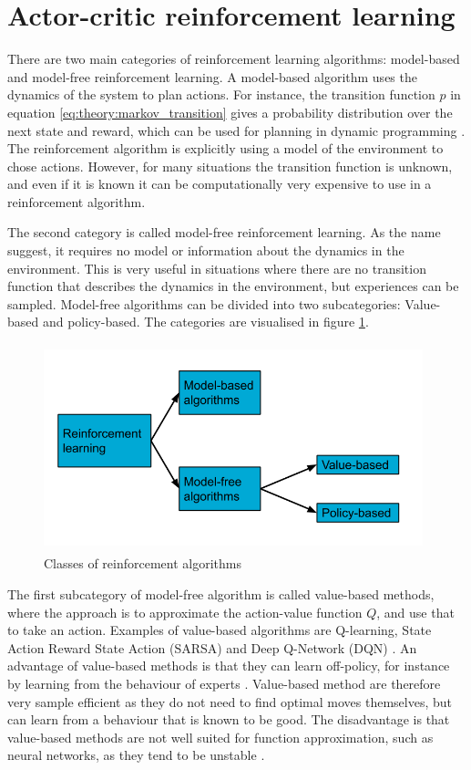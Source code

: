 \documentclass[class=book, crop=false]{standalone}
\begin{document}
\section{Actor-critic reinforcement learning}
There are two main categories of reinforcement learning algorithms: model-based and model-free reinforcement learning. A model-based algorithm uses the dynamics of the system to plan actions. For instance, the transition function $p$ in equation \eqref{eq:theory:markov_transition}  gives a probability distribution over the next state and reward, which can be used for planning in dynamic programming \cite{silver_course}. The reinforcement algorithm is explicitly using a model of the environment to chose actions. However, for many situations the transition function is unknown, and even if it is known it can be computationally very expensive to use in a reinforcement algorithm.

The second category is called model-free reinforcement learning. As the name suggest, it requires no model or information about the dynamics in the environment. This is very useful in situations where there are no transition function that describes the dynamics in the environment, but experiences can be sampled. Model-free algorithms can be divided into two subcategories: Value-based and policy-based. The categories are visualised in figure \ref{fig:theory:rl_model_modelfree}.


\begin{figure}[ht!]
    \center
    \includegraphics[height=6cm, width=11cm]{figures/rl_model_modelfree.png}
    \caption[size = 9]{Classes of reinforcement algorithms}
    \label{fig:theory:rl_model_modelfree}
\end{figure}


The first subcategory of model-free algorithm is called value-based methods, where the approach is to approximate the action-value function $Q$, and use that to take an action. Examples of value-based algorithms are Q-learning, State Action Reward State Action (SARSA) and Deep Q-Network (DQN) \cite{Sutton1998}. An advantage of value-based methods is that they can learn off-policy, for instance by learning from the behaviour of experts \cite{value_based_policy_Nachum}. Value-based method are therefore very sample efficient as they do not need to find optimal moves themselves, but can learn from a behaviour that is known to be good. The disadvantage is that value-based methods are not well suited for function approximation, such as neural networks, as they tend to be unstable \cite{Sutton1998}. 
\end{document}
